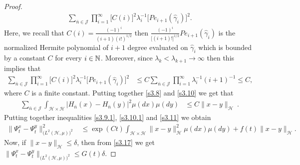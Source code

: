 \documentclass[review,onefignum,onetabnum]{siamart190516}
\begin{document}
\begin{proof}
\begin{equation}
\begin{aligned}
        \sum_{\bar n\in \mathcal{J}}
            \prod_{i=1}^\infty
            \Big[
                C(i)
            \Big]^2
            \lambda_i^{-1}
            \Big[
                Pe_{i+1}(\hat \gamma_i)
            \Big]^2 .
    \end{aligned}
\end{equation}
Here, we recall that $C(i)=\frac{(-1)^i}{(i+1)(i!)^{1/2}} $ then
$\frac{(-1)^i}{\big[(i+1)!\Big]^{1/2}} Pe_{i+1}(\hat \gamma_i)$
is the normalized Hermite polynomial of $i+1$ degree evaluated on
$\hat \gamma_i$ which is bounded by a constant $C$ for every $i\in{\mathbb N}$.
Moreover, since $\lambda_k<\lambda_{k+1}\rightarrow \infty $
then this implies that
\begin{align}
    \label{s3.10}
  \sum_{\bar n\in \mathcal{J}}  \prod_{i=1}^\infty \Big[C(i)\Big]^2
  \lambda_i^{-1} \Big[Pe_{i+1}(\hat \gamma_i)\Big]^2 & \le C \sum_{\bar n\in
    \mathcal{J}}  \prod_{i=1}^\infty
  \lambda_i^{-1}(i+1)^{-1}
  \le C,
\end{align}
where $C$ is a finite constant. Putting together \eqref{s3.8} and
\eqref{s3.10} we get that
\begin{align}
    \sum_{\bar n\in \mathcal{J}} \int_{\mathcal{H}\times \mathcal{H}}  \big|
    H_{\bar n}(x) -H_{\bar n}(y) \big|^2 \mu(dx)\mu(dy) &\le
    C \| x-y\|_{\mathcal{H}} \ .
    \label{s3.11}
\end{align}
Putting together inequalities \eqref{s3.9.1}, \eqref{s3.10.1} and
\eqref{s3.11} we obtain
\begin{align}
  \| \Psi_t^x-\Psi_t^y\|_{\big(L^2(\mathcal{H},\mu) \big)^2}^2&\le   \exp(Ct)
  \int_{\mathcal{H}\times \mathcal{H}}
  \| x-y\|_{\mathcal{H}}^2 \mu(dx)\mu(dy) +  f(t)\| x-y\|_{\mathcal{H}}.
  \label{s3.17}
\end{align}
Now, if $\| x-y\|_{\mathcal{H}}\le \delta $, then from \eqref{s3.17} we get
$
 \| \Psi_t^x-\Psi_t^y\|_{\big(L^2(\mathcal{H},\mu) \big)^2} \le
  G(t) \delta %
$.
\end{proof}
\end{document}
